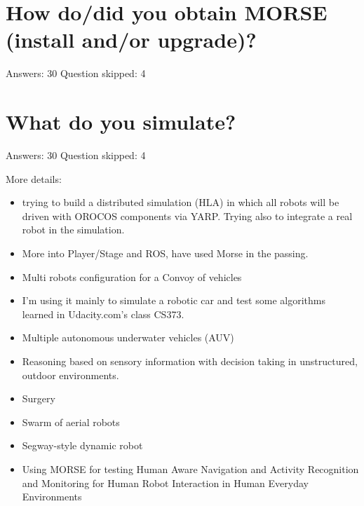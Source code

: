 \documentclass{article}
\newcommand{\answer}[1]{Answers: #1}
\newcommand{\skipped}[1]{Question skipped: #1}
\newcommand{\barcolor}{green!60!blue}
\begin{document}
\section{How do/did you obtain MORSE (install and/or upgrade)?}

\answer{30}
\skipped{4}

\begin{bchart}[max=30]
\bcbar[label=From the sources (80.0\%),color=\barcolor]{24}
\bcbar[label=robotpkg (30.0\%),color=\barcolor]{9}
\bcbar[label=rosinstall (3.3\%),color=\barcolor]{1}
\bcbar[label=autoproj (6.7\%),color=\barcolor]{2}
\end{bchart}

\section{What do you simulate?}

\answer{30}
\skipped{4}

\begin{bchart}[max=30]
\bcbar[label=Single robot (73.3\%),color=\barcolor]{22}
\bcbar[label=Multiple robots (23.3\%),color=\barcolor]{7}
\bcbar[label=Outdoor robotics (40.0\%),color=\barcolor]{12}
\bcbar[label=Indoor robotics (43.3\%),color=\barcolor]{13}
\bcbar[label=Human-robot interaction (26.7\%),color=\barcolor]{8}
\bcbar[label=Physical interactions with the environment (36.7\%),color=\barcolor]{11}
\bcbar[label=Flying robots (13.3\%),color=\barcolor]{4}
\bcbar[label=Underwater robots (6.7\%),color=\barcolor]{2}
\end{bchart}

More details:
\begin{itemize}
    \item trying to build a distributed simulation (HLA) in which all robots will be driven with OROCOS components via YARP. Trying also to integrate a real robot in the simulation.
	\item More into Player/Stage and ROS, have used Morse in the passing.
	\item Multi robots configuration for a Convoy of vehicles
	\item I'm using it mainly to simulate a robotic car and test some algorithms learned in Udacity.com's class CS373.
	\item Multiple autonomous underwater vehicles (AUV)
	\item Reasoning based on sensory information with decision taking in unstructured, outdoor environments.
	\item Surgery
	\item Swarm of aerial robots
	\item Segway-style dynamic robot
	\item Using MORSE for testing Human Aware Navigation and Activity Recognition and Monitoring for Human Robot Interaction in Human Everyday Environments
\end{itemize}
\end{document}
